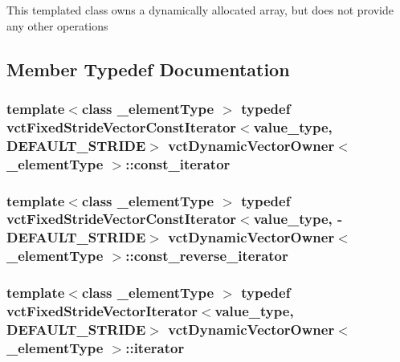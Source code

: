This templated class owns a dynamically allocated array, but does not provide any other operations 

\subsection{Member Typedef Documentation}
\hypertarget{classvct_dynamic_vector_owner_a607608d191422c1d82168ffecd37c853}{
\subsubsection[{const\-\_\-iterator}]{\setlength{\rightskip}{0pt plus 5cm}template$<$class \-\_\-element\-Type $>$ typedef {\bf vct\-Fixed\-Stride\-Vector\-Const\-Iterator}$<$value\-\_\-type, {\bf D\-E\-F\-A\-U\-L\-T\-\_\-\-S\-T\-R\-I\-D\-E}$>$ {\bf vct\-Dynamic\-Vector\-Owner}$<$ \-\_\-element\-Type $>$\-::{\bf const\-\_\-iterator}}}\label{classvct_dynamic_vector_owner_a607608d191422c1d82168ffecd37c853}
\hypertarget{classvct_dynamic_vector_owner_ab157dd93c9061bb74e4a5983606e200a}{
\subsubsection[{const\-\_\-reverse\-\_\-iterator}]{\setlength{\rightskip}{0pt plus 5cm}template$<$class \-\_\-element\-Type $>$ typedef {\bf vct\-Fixed\-Stride\-Vector\-Const\-Iterator}$<$value\-\_\-type, -\/{\bf D\-E\-F\-A\-U\-L\-T\-\_\-\-S\-T\-R\-I\-D\-E}$>$ {\bf vct\-Dynamic\-Vector\-Owner}$<$ \-\_\-element\-Type $>$\-::{\bf const\-\_\-reverse\-\_\-iterator}}}\label{classvct_dynamic_vector_owner_ab157dd93c9061bb74e4a5983606e200a}
\hypertarget{classvct_dynamic_vector_owner_a0ef55f887d1340204d64f21d4db08fad}{
\subsubsection[{iterator}]{\setlength{\rightskip}{0pt plus 5cm}template$<$class \-\_\-element\-Type $>$ typedef {\bf vct\-Fixed\-Stride\-Vector\-Iterator}$<$value\-\_\-type, {\bf D\-E\-F\-A\-U\-L\-T\-\_\-\-S\-T\-R\-I\-D\-E}$>$ {\bf vct\-Dynamic\-Vector\-Owner}$<$ \-\_\-element\-Type $>$\-::{\bf iterator}}}\label{classvct_dynamic_vector_owner_a0ef55f887d1340204d64f21d4db08fad}
